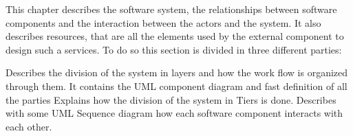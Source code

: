 This chapter describes the software system, the relationships between software components and the interaction between the actors and the system. It also describes resources, that are all the elements used by the external component to design such a services. To do so this section is divided in three different parties:
\begin{itemize}
	 Describes the division of the system in layers and how the work flow is organized through them. It contains the UML component diagram and fast definition of all the parties
	 Explains how the division of the system in Tiers is done.
	 Describes with some UML Sequence diagram how each software component interacts with each other. 
\end{itemize}
